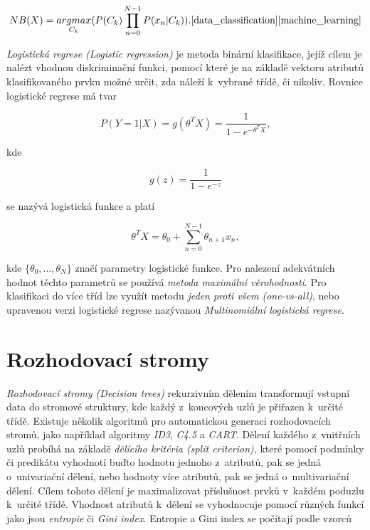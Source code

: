 \begin{equation}
	NB(X) = \underset{C_k}{argmax}(P(C_k) \prod\limits_{n=0}^{N-1} P(x_n|C_k)).\text{\cite{data_classification}\cite{machine_learning}}
\end{equation}

\medskip

\textit{Logistická regrese (Logistic regression)} je metoda binární klasifikace, jejíž cílem je nalézt vhodnou diskriminační funkci, pomocí které je na základě vektoru atributů klasifikovaného prvku možné určit, zda náleží k~vybrané třídě, či nikoliv. Rovnice logistické regrese má tvar

\begin{equation}
    P(Y=1|X) = g(\theta^T X) = \frac{1}{1-e^{-\theta^T X}},
\end{equation}

\medskip

\noindent kde 

\begin{equation}
    g(z) = \frac{1}{1-e^{-z}}
\end{equation}

\medskip

\noindent se nazývá logistická funkce a platí

\begin{equation}
    \theta^T X = \theta_0 + \sum\limits_{n=0}^{N-1} \theta_{n+1} x_n,
\end{equation}

\medskip

\noindent kde $\{\theta_0, \dots, \theta_N\}$ značí parametry logistické funkce. Pro nalezení adekvátních hodnot těchto parametrů se používá \textit{metoda maximální věrohodnosti}. Pro klasifikaci do více tříd lze využít metodu \textit{jeden proti všem (one-vs-all)}, nebo upravenou verzi logistické regrese nazývanou \textit{Multinomiální logistická regrese}.\cite{data_classification}\cite{understanding_machine_learning}

\section{Rozhodovací stromy}
\label{rozhodovaci_stromy}
\textit{Rozhodovací stromy (Decision trees)} rekurzivním dělením transformují vstupní data do stromové struktury, kde každý z~koncových uzlů je přiřazen k~určité třídě. Existuje několik algoritmů pro automatickou generaci rozhodovacích stromů, jako například algoritmy \textit{ID3}, \textit{C4.5} a \textit{CART}. Dělení každého z~vnitřních uzlů probíhá na základě \textit{dělícího kritéria (split criterion)}, které pomocí podmínky či predikátu vyhodnotí buďto hodnotu jednoho z~atributů, pak se jedná o~univariační dělení, nebo hodnoty více atributů, pak se jedná o~multivariační dělení. Cílem tohoto dělení je maximalizovat příslušnost prvků v~každém poduzlu k~určité třídě. Vhodnost atributů k~dělení se vyhodnocuje pomocí různých funkcí jako jsou \textit{entropie} či \textit{Gini index}. Entropie a Gini index se počítají podle vzorců

